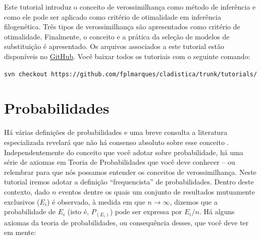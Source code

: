\begin{refsection}
\renewcommand*{\finalnamedelim}{\addspace\&\space} %

Este tutorial introduz o conceito de verossimilhança como método de inferência e como ele pode ser aplicado como critério de otimalidade em inferência filogenética. Três tipos de verossimilhança são apresentados como critério de otimalidade. Finalmente, o conceito e a prática da seleção de modelos de substituição é apresentado. Os arquivos associados a este tutorial estão disponíveis no \href{https://github.com/fplmarques/cladistica/tree/main/tutorials/}{GitHub}. Você baixar todos os tutoriais com o seguinte comando:

\begin{center}
\small \texttt{svn checkout https://github.com/fplmarques/cladistica/trunk/tutorials/}\\
\end{center}


\newpage
\pagestyle{fancy} %
\newcommand{\A}{\textcolor{green}{\textbf{A}}}
\newcommand{\C}{\textcolor{blue}{\textbf{C}}}
\newcommand{\G}{\textcolor{gray}{\textbf{G}}}
\newcommand{\T}{\textcolor{red}{\textbf{T}}}
\newcommand{\gap}{\textcolor{black}{\textbf{-}}}


\section{Probabilidades}\label{tut12:probs}
Há várias definições de probabilidades e uma breve consulta a literatura especializada revelará que não há consenso absoluto sobre esse conceito \parencite{Thacker_2014}. Independentemente do conceito que você adotar sobre probabilidade, há uma série de axiomas em Teoria de Probabilidades que você deve conhecer -- ou relembrar para que nós possamos entender os conceitos de verossimilhança. Neste tutorial iremos adotar a definição ``frequencista'' de probabilidades. Dentro deste contexto, dado $n$ eventos dentre os quais um conjunto de resultados mutuamente exclusivos ($E_{i}$) é observado, à medida em que $n \rightarrow \infty$, dizemos que a probabilidade de $E_{i}$ (isto é, $P_{(E_{i})}$) pode ser expressa por $E_{i}/n$. Há alguns axiomas da teoria de probabilidades, ou consequência desses, que você deve ter em mente:


\end{refsection}
